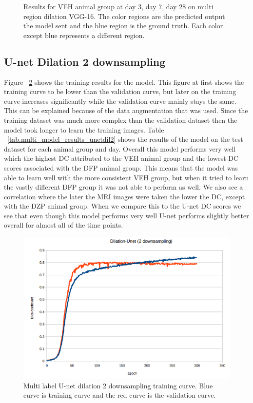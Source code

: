 \begin{figure}[!htb]
  \caption{Results for VEH animal group at day 3, day 7, day 28 on multi region dilation VGG-16. The color regions are the predicted output the model sent and the blue region is the ground truth. Each color except blue represents a different region.}
  \label{fig:results_multi_dilation_VEH}
\end{figure}


\subsection{U-net Dilation 2 downsampling}
    Figure ~\ref{fig:results_multi_unetdil2_train} shows the training results for the model.
    This figure at first shows the training curve to be lower than the validation curve, but later on the training curve increases significantly while the validation curve mainly stays the same. 
    This can be explained because of the data augmentation that was used. Since the training dataset was much more complex than the validation dataset then the model took longer to learn the training images. 
    Table ~\ref{tab.multi_model_results_unetdil2} shows the results of the model on the test dataset for each animal group and day. 
    Overall this model performs very well which the highest DC attributed to the VEH animal group and the lowest DC scores associated with the DFP animal group. 
    This means that the model was able to learn well with the more consistent VEH group, but when it tried to learn the vastly different DFP group it was not able to perform as well. 
    We also see a correlation where the later the MRI images were taken the lower the DC, except with the DZP animal group. 
    When we compare this to the U-net DC scores we see that even though this model performs very well U-net performs slightly better overall for almost all of the time points. 

\begin{figure}[!tbh]
\centering
\includegraphics[width=\textwidth]{results/train_results_multi_unetdil2.png}
\caption{Multi label U-net dilation 2 downsampling training curve. Blue curve is training curve and the red curve is the validation curve. }
\label{fig:results_multi_unetdil2_train}
\end{figure}


